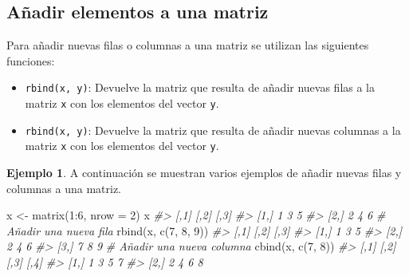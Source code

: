 \documentclass[
]{book}
\newenvironment{Shaded}{\begin{snugshade}}{\end{snugshade}}
\newcommand{\AttributeTok}[1]{\textcolor[rgb]{0.77,0.63,0.00}{#1}}
\newcommand{\CommentTok}[1]{\textcolor[rgb]{0.56,0.35,0.01}{\textit{#1}}}
\newcommand{\DecValTok}[1]{\textcolor[rgb]{0.00,0.00,0.81}{#1}}
\newcommand{\FunctionTok}[1]{\textcolor[rgb]{0.00,0.00,0.00}{#1}}
\newcommand{\NormalTok}[1]{#1}
\newcommand{\OtherTok}[1]{\textcolor[rgb]{0.56,0.35,0.01}{#1}}
\newcommand{\SpecialCharTok}[1]{\textcolor[rgb]{0.00,0.00,0.00}{#1}}
\providecommand{\tightlist}{%
  \setlength{\itemsep}{0pt}\setlength{\parskip}{0pt}}
\theoremstyle{definition}
\theoremstyle{definition}
\newtheorem{example}{Ejemplo}[chapter]
\theoremstyle{definition}
\theoremstyle{definition}
\theoremstyle{remark}
\begin{document}
\hypertarget{auxf1adir-elementos-a-una-matriz}{%
\subsection{Añadir elementos a una matriz}\label{auxf1adir-elementos-a-una-matriz}}

Para añadir nuevas filas o columnas a una matriz se utilizan las siguientes funciones:

\begin{itemize}
\tightlist
\item
  \texttt{rbind(x,\ y)}: Devuelve la matriz que resulta de añadir nuevas filas a la matriz \texttt{x} con los elementos del vector \texttt{y}.
\item
  \texttt{rbind(x,\ y)}: Devuelve la matriz que resulta de añadir nuevas columnas a la matriz \texttt{x} con los elementos del vector \texttt{y}.
\end{itemize}

\begin{example}

A continuación se muestran varios ejemplos de añadir nuevas filas y columnas a una matriz.

\begin{Shaded}
\begin{Highlighting}[]
\NormalTok{x }\OtherTok{\textless{}{-}} \FunctionTok{matrix}\NormalTok{(}\DecValTok{1}\SpecialCharTok{:}\DecValTok{6}\NormalTok{, }\AttributeTok{nrow =} \DecValTok{2}\NormalTok{)}
\NormalTok{x}
\CommentTok{\#\textgreater{}      [,1] [,2] [,3]}
\CommentTok{\#\textgreater{} [1,]    1    3    5}
\CommentTok{\#\textgreater{} [2,]    2    4    6}
\CommentTok{\# Añadir una nueva fila}
\FunctionTok{rbind}\NormalTok{(x, }\FunctionTok{c}\NormalTok{(}\DecValTok{7}\NormalTok{, }\DecValTok{8}\NormalTok{, }\DecValTok{9}\NormalTok{))}
\CommentTok{\#\textgreater{}      [,1] [,2] [,3]}
\CommentTok{\#\textgreater{} [1,]    1    3    5}
\CommentTok{\#\textgreater{} [2,]    2    4    6}
\CommentTok{\#\textgreater{} [3,]    7    8    9}
\CommentTok{\# Añadir una nueva columna}
\FunctionTok{cbind}\NormalTok{(x, }\FunctionTok{c}\NormalTok{(}\DecValTok{7}\NormalTok{, }\DecValTok{8}\NormalTok{))}
\CommentTok{\#\textgreater{}      [,1] [,2] [,3] [,4]}
\CommentTok{\#\textgreater{} [1,]    1    3    5    7}
\CommentTok{\#\textgreater{} [2,]    2    4    6    8}
\end{Highlighting}
\end{Shaded}

\end{example}
\end{document}
